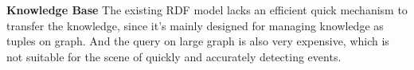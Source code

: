\documentclass{article}
\begin{document}
\textbf{Knowledge Base} The existing RDF model\cite{klyne2006rdf} lacks an efficient quick mechanism to transfer the knowledge, since it's mainly designed for managing knowledge as tuples on graph. And the query on large graph is also very expensive\cite{huang2011scalable}, which is not suitable for the scene of quickly and accurately detecting events.







\end{document}
